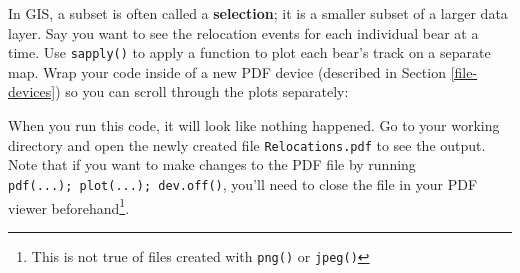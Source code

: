 \documentclass[]{book}
\newenvironment{Shaded}{\begin{snugshade}}{\end{snugshade}}
\newcommand{\KeywordTok}[1]{\textcolor[rgb]{0.13,0.29,0.53}{\textbf{#1}}}
\newcommand{\DataTypeTok}[1]{\textcolor[rgb]{0.13,0.29,0.53}{#1}}
\newcommand{\DecValTok}[1]{\textcolor[rgb]{0.00,0.00,0.81}{#1}}
\newcommand{\FloatTok}[1]{\textcolor[rgb]{0.00,0.00,0.81}{#1}}
\newcommand{\StringTok}[1]{\textcolor[rgb]{0.31,0.60,0.02}{#1}}
\newcommand{\CommentTok}[1]{\textcolor[rgb]{0.56,0.35,0.01}{\textit{#1}}}
\newcommand{\ControlFlowTok}[1]{\textcolor[rgb]{0.13,0.29,0.53}{\textbf{#1}}}
\newcommand{\OperatorTok}[1]{\textcolor[rgb]{0.81,0.36,0.00}{\textbf{#1}}}
\newcommand{\NormalTok}[1]{#1}
\let\rmarkdownfootnote\footnote%
\def\footnote{\protect\rmarkdownfootnote}
\theoremstyle{definition}
\theoremstyle{definition}
\theoremstyle{definition}
\theoremstyle{remark}
\begin{document}
In GIS, a subset is often called a \textbf{selection}; it is a smaller
subset of a larger data layer. Say you want to see the relocation events
for each individual bear at a time. Use \texttt{sapply()} to apply a
function to plot each bear's track on a separate map. Wrap your code
inside of a new PDF device (described in Section \ref{file-devices}) so
you can scroll through the plots separately:

\begin{Shaded}
\end{Shaded}

When you run this code, it will look like nothing happened. Go to your
working directory and open the newly created file
\texttt{Relocations.pdf} to see the output. Note that if you want to
make changes to the PDF file by running
\texttt{pdf(...);\ plot(...);\ dev.off()}, you'll need to close the file
in your PDF viewer beforehand\footnote{This is not true of files created
  with \texttt{png()} or \texttt{jpeg()}}.
\end{document}
